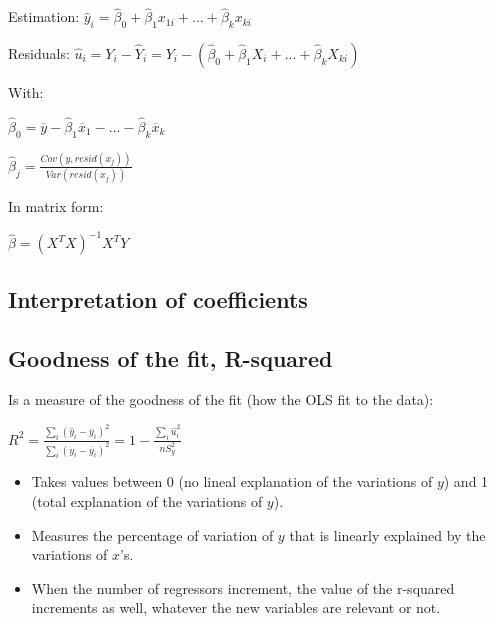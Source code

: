 \documentclass[10pt,landscape]{article}
\begin{document}
\begin{multicols}{3}
Estimation: $\hat{y}_i = \hat{\beta}_0 + \hat{\beta}_1 x_{1i} + ... + \hat{\beta}_k x_{ki}$

Residuals: $\hat{u}_i = Y_i - \hat{Y}_i = Y_i - (\hat{\beta}_0 + \hat{\beta}_1 X_i + ... + \hat{\beta}_k X_{ki})$

With:

$\hat{\beta}_0 = \overline{y} - \hat{\beta}_1 \overline{x}_1 - ... - \hat{\beta}_k \overline{x}_k$

$\hat{\beta}_j = \frac{Cov(y, resid(x_j))}{Var(resid(x_j))}$

In matrix form:

$\hat{\beta} = (X^T X)^{-1} X^T Y$

\subsection*{Interpretation of coefficients}


\subsection*{Goodness of the fit, R-squared}

Is a measure of the goodness of the fit (how the OLS fit to the data):

$R^2 = \frac{\sum_i (\hat{y}_i - \overline{y}_i)^2}{\sum_i (y_i - \overline{y}_i)^2} = 1 - \frac{\sum_i \hat{u}_i^2}{nS_y^2}$

\begin{itemize}[leftmargin=*]
\item Takes values between 0 (no lineal explanation of the variations of $y$) and 1 (total explanation of the variations of $y$).
\item Measures the percentage of variation of $y$ that is linearly explained by the variations of $x$'s.
\item When the number of regressors increment, the value of the r-squared increments as well, whatever the new variables are relevant or not.
\end{itemize}


\end{multicols}
\end{document}
